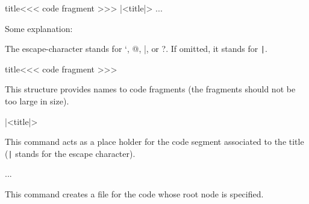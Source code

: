 \begin{texsource}

\<title\><<<
code fragment
>>>  
|<title|>
\OutputCode\<...\> 
\end{texsource}

Some explanation:

\begin{texsource}

\end{texsource}

The escape-character stands for `, @, |, or ?. If omitted, it stands for \verb'|'. 

\begin{texsource}
\<title\><<<
code fragment
>>>

\end{texsource}

This structure provides names to code fragments (the fragments should not be too large in size).


\begin{texsource}
 |<title|>
 \end{texsource}

 This command acts as a place holder for the code segment associated to the title (\texttt{|} stands for the escape character). 

\begin{texsource}
   \OutputCode\<...\>
 \end{texsource}

This command creates a file for the code whose root node is specified.



